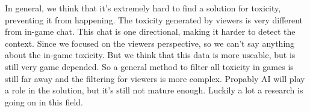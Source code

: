 \documentclass[final]{report}
\begin{document}
In general, we think that it's extremely hard to find a solution for toxicity, preventing it from happening. The toxicity generated by viewers is very different from in-game chat. This chat is one directional, making it harder to detect the context. Since we focused on the viewers perspective, so we can't say anything about the in-game toxicity. But we think that this data is more useable, but is still very game depended. So a general method to filter all toxicity in games is still far away and the filtering for viewers is more complex. Propably AI will play a role in the solution, but it's still not mature enough. Luckily a lot a research is going on in this field.
\end{document}
